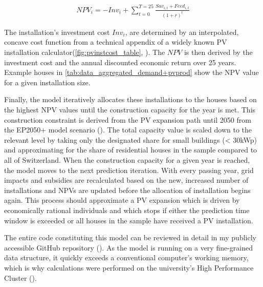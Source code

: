 \documentclass[12PT, ]{article}
\begin{document}
\begin{equation}
\label{equ:NPV_calc}
    \begin{aligned}
    NPV_{i} = -Inv_{i} + \sum_{t=0}^{T=25}\frac{Sav_{i,t} + Feed_{i,t}}{(1+r)^t}
    \end{aligned}
\end{equation}

The installation's investment cost $Inv_i$, are determined by an interpolated, concave cost function from a technical appendix of a widely known PV installation calculator(\ref{fig:pvinstcost_table}, \cite{energieschweiz2023}).
The $NPV$ is then derived by the investment cost and the annual discounted economic return over 25 years. Example houses in \ref{tab:data_aggregated_demand+pvprod} show the NPV value for a given installation size.

Finally, the model iteratively allocates these installations to the houses based on the highest NPV values until the construction capacity for the year is met. This construction constraint is derived from the PV expansion path until 2050 from the EP2050+ model scenario (\cite{bfe_ep2050_2020}). The total capacity value is scaled down to the relevant level by taking only the designated share for small buildings (< 30kWp) and approximating for the share of residential houses in the sample compared to all of Switzerland. 
When the construction capacity for a given year is reached, the model moves to the next prediction iteration. With every passing year, grid impacts and subsidies are recalculated based on the new, increased number of installations and NPVs are updated before the allocation of installation begins again. 
This process should approximate a PV expansion which is driven by economically rational individuals and which stops if either the prediction time window is exceeded or all houses in the sample have received a PV installation. 

The entire code constituting this model can be reviewed in detail in my publicly accessible GitHub repository (\cite{github_redacted2026}).
As the model is running on a very fine-grained data structure, it quickly exceeds a conventional computer's working memory, which is why calculations were performed on the university's High Performance Cluster (\cite{hpc_redacted2026}).
\end{document}
